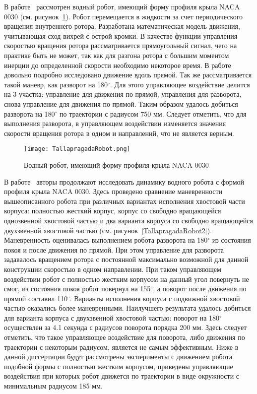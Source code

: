 В работе~\cite{Pollard_Tallapragada_2016} рассмотрен водный робот, имеющий форму профиля крыла NACA 0030 (см. рисунок~\ref{TallapragadaRobot}). Робот перемещается в жидкости за счет периодического вращения внутреннего ротора. Разработана математическая модель движения, учитывающая сход вихрей с острой кромки. В качестве функции управления скоростью вращения ротора рассматривается прямоугольный сигнал, чего на практике быть не может, так как для разгона ротора с большим моментом инерции до определенной скорости необходимо некоторое время. В работе довольно подробно исследовано движение вдоль прямой. Так же рассматривается такой маневр, как разворот на 180$^\circ$. Для этого управляющее воздействие делится на 3 участка: управление для движения по прямой, управления для разворота, снова управление для движения по прямой. Таким образом удалось добиться разворота на 180$^\circ$ по траектории с радиусом 750 мм. Следует отметить, что для выполнения разворота, в управляющем воздействии изменяется значения скорости вращения ротора в одном и направлений, что не является верным.

\begin{figure}[h]
	\centering
	\texttt{[image: TallapragadaRobot.png]}%
	\caption{Водный робот, имеющий форму профиля крыла NACA 0030}
	\label{TallapragadaRobot}
\end{figure}

В работе~\cite{Pollard_Tallapragada_2019} авторы продолжают исследовать динамику водного робота с формой профиля крыла NACA 0030. Здесь проведено сравнение маневренности вышеописанного робота при различных вариантах исполнения хвостовой части корпуса: полностью жесткий корпус, корпус со свободно вращающейся однозвенной хвостовой частью и два варианта корпуса со свободно вращающейся двухзвенной хвостовой частью (см. рисунок~\ref{TallapragadaRobot2}). Маневренность оценивалась выполнением робота разворота на 180$^\circ$ из состояния покоя и после движения по прямой. При этом управление для разворота задавалось вращением ротора с постоянной максимально возможной для данной конструкции скоростью в одном направлении. При таком управляющем воздействии робот с полностью жестким корпусом на данный угол повернуть не смог, из состояния покоя робот повернул на 155$^\circ$, а поворот после движения по прямой составил 110$^\circ$. Варианты исполнения корпуса с подвижной хвостовой частью оказались более маневренными. Наилучшего результата удалось добиться для варианта корпуса с двухзвенной хвостовой частью: поворот на 180$^\circ$ осуществлен за 4.1 секунда с радиусов поворота порядка 200 мм. Здесь следует отметить, что такое управляющее воздействие для поворота, либо движения по траектории с некоторым радиусом, является не самым эффективным. Ниже в данной диссертации будут рассмотрены эксперименты с движением робота подобной формы с полностью жестким корпусом, приведены управляющие воздействия при которых робот движется по траектории в виде окружности с минимальным радиусом 185 мм.

